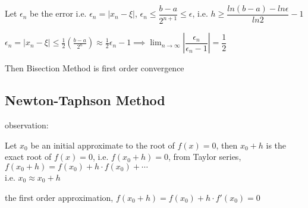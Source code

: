 Let $\epsilon_n$ be the error i.e. $\epsilon_n = |x_n - \xi|$, $\epsilon_n \leq \dfrac{b-a}{2^{n+1}} \leq \epsilon$, i.e. $h \geq \dfrac{ln(b-a) - ln\epsilon}{ln2}-1$

$\epsilon_n = |x_n - \xi| \leq \frac{1}{2}(\frac{b-a}{2^n}) \approx \frac{1}{2}\epsilon_n - 1 \implies \lim_{n \rightarrow \infty}|\dfrac{\epsilon_n}{\epsilon_n - 1}| = \dfrac{1}{2}$

Then Bisection Method is first order convergence

\subsection{Newton-Taphson Method}$ $\\
observation:

Let $x_0$ be an initial approximate to the root of $f(x) = 0$, then $x_0 + h$ is the exact root of $f(x)=0$, i.e. $f(x_0 + h) = 0$, from Taylor series, $f(x_0+h) = f(x_0)+h\cdot f(x_0)+\cdots$\\i.e. $x_0 \approx x_0 + h$

the first order approximation, $f(x_0+h) = f(x_0)+h\cdot f'(x_0)=0$






































